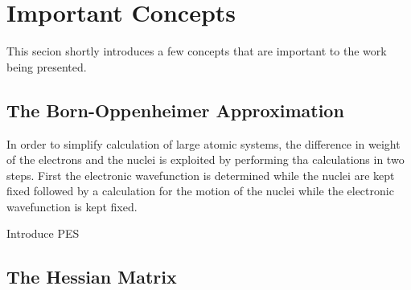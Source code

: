 \section{Important Concepts}
\label{sec:important-concepts}

This secion shortly introduces a few concepts that are important to the work being presented.

\incomplete
\subsection{The Born-Oppenheimer Approximation}
\label{sec:born-oppenheimer}

In order to simplify calculation of large atomic systems, the difference in weight of the electrons and the nuclei is exploited by performing tha calculations in two steps.
First the electronic wavefunction is determined while the nuclei are kept fixed followed by a calculation for the motion of the nuclei while the electronic wavefunction is kept fixed.

\bit
\item Introduce PES
\eit

\incomplete

%

%

\subsection{The Hessian Matrix}
\label{sec:hessian}

